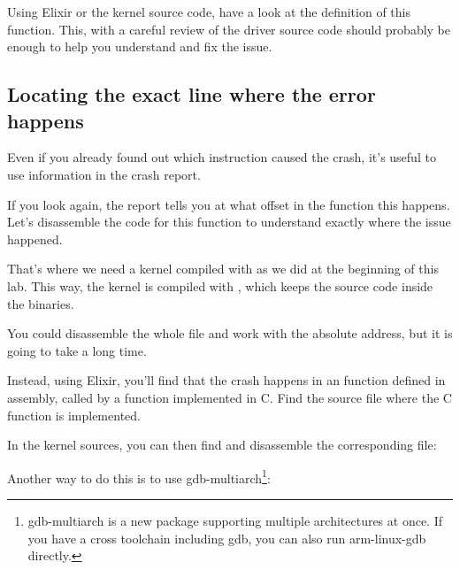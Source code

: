 Using Elixir or the kernel source code, have a look at the definition of this
function. This, with a careful review of the driver source code should
probably be enough to help you understand and fix the issue.

\subsection{Locating the exact line where the error happens}

Even if you already found out which instruction caused the crash, it's
useful to use information in the crash report.

If you look again, the report tells you at what offset in the function
this happens. Let's disassemble the code for this function to
understand exactly where the issue happened.

That's where we need a kernel compiled with 
as we did at the beginning of this lab. This way, the kernel is
compiled with , which keeps the source
code inside the binaries.

You could disassemble the whole  file and work with
the  absolute address, but it is going to take a long time.

Instead, using Elixir, you'll find that the crash happens in an function
defined in assembly, called by a function implemented in C. Find
the  source file where the C function is implemented.

In the kernel sources, you can then find
and disassemble the corresponding  file:

\if{}\fi
\if{}\fi

Another way to do this is to use {gdb-multiarch}\footnote{gdb-multiarch is a new package
supporting multiple architectures at once. If you have a cross
toolchain including gdb, you can also run arm-linux-gdb directly.}:

\if{}\fi
\if{}\fi

